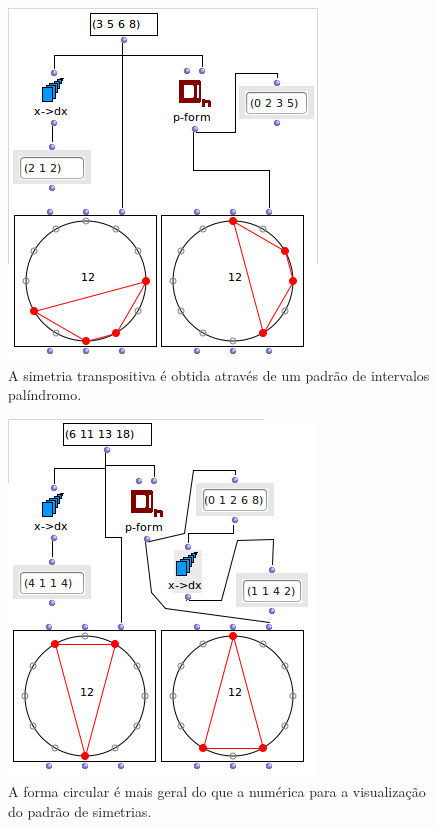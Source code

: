 \documentclass[
	12pt,				%
	openright,			%
	twoside,			%
	a4paper,			%
	english,			%
	french,				%
	spanish,			%
	brazil				%
	]{abntex2}
\begin{document}
\begin{figure}[!h]
	\caption{\label{fig_grafico}A simetria transpositiva é obtida através de um padrão de intervalos palíndromo. }
	\begin{center}
	    \includegraphics[scale=0.7]{OM_settheory/palindrome1.png}
	\end{center}
\end{figure}

\begin{figure}[!h]
	\caption{\label{fig_grafico}A forma circular é mais geral do que a numérica para a visualização do padrão de simetrias. }
	\begin{center}
	    \includegraphics[scale=0.7]{OM_settheory/palindrome2.png}
	\end{center}
\end{figure}
\end{document}

